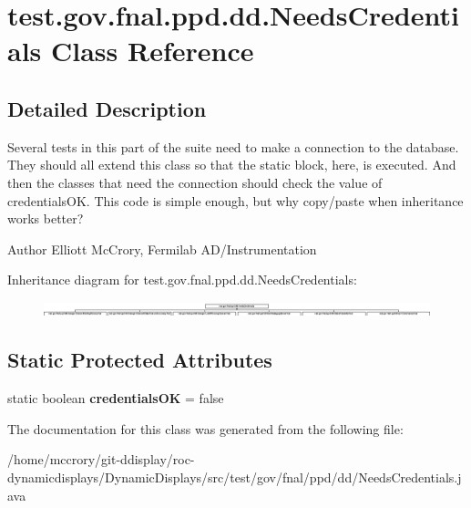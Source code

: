 \hypertarget{classtest_1_1gov_1_1fnal_1_1ppd_1_1dd_1_1NeedsCredentials}{\section{test.\-gov.\-fnal.\-ppd.\-dd.\-Needs\-Credentials Class Reference}
\label{classtest_1_1gov_1_1fnal_1_1ppd_1_1dd_1_1NeedsCredentials}
}


\subsection{Detailed Description}
Several tests in this part of the suite need to make a connection to the database. They should all extend this class so that the static block, here, is executed. And then the classes that need the connection should check the value of credentials\-O\-K. This code is simple enough, but why copy/paste when inheritance works better?

\begin{DoxyAuthor}{Author}
Elliott Mc\-Crory, Fermilab A\-D/\-Instrumentation 
\end{DoxyAuthor}
Inheritance diagram for test.\-gov.\-fnal.\-ppd.\-dd.\-Needs\-Credentials\-:\begin{figure}[H]
\begin{center}
\leavevmode
\includegraphics[height=0.410256cm]{classtest_1_1gov_1_1fnal_1_1ppd_1_1dd_1_1NeedsCredentials}
\end{center}
\end{figure}
\subsection*{Static Protected Attributes}
\begin{DoxyCompactItemize}
\item 
\hypertarget{classtest_1_1gov_1_1fnal_1_1ppd_1_1dd_1_1NeedsCredentials_a2db70b93bc3c6d68e11319152311d616}{static boolean {\bfseries credentials\-O\-K} = false}\label{classtest_1_1gov_1_1fnal_1_1ppd_1_1dd_1_1NeedsCredentials_a2db70b93bc3c6d68e11319152311d616}

\end{DoxyCompactItemize}


The documentation for this class was generated from the following file\-:\begin{DoxyCompactItemize}
\item 
/home/mccrory/git-\/ddisplay/roc-\/dynamicdisplays/\-Dynamic\-Displays/src/test/gov/fnal/ppd/dd/Needs\-Credentials.\-java\end{DoxyCompactItemize}
